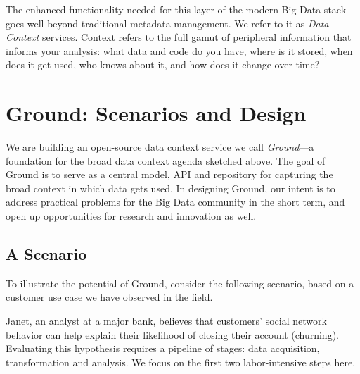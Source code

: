 \documentclass{sig-alternate}
\begin{document}
The enhanced functionality needed for this layer of the modern Big Data stack goes well beyond traditional metadata management. We refer to it as \emph{Data Context} services. Context refers to the full gamut of peripheral information that informs your analysis: what data and code do you have, where is it stored, when does it get used, who knows about it, and how does it change over time?  

\section{Ground: Scenarios and Design}
We are building an open-source data context service we call \emph{Ground}---a foundation for the broad data context agenda sketched above. 
The goal of Ground is to serve as a central model, API and repository for capturing the broad context in which data gets used. In designing Ground, our intent is to address practical problems for the Big Data community in the short term, and open up opportunities for research and innovation as well.

\subsection{A Scenario}
\label{sec:scenarios}
To illustrate the potential of Ground, consider the following scenario, based on a customer use case we have observed in the field.


Janet, an analyst at a major bank, believes that customers' social network behavior can help explain their likelihood of closing their account (churning). 
Evaluating this hypothesis requires a pipeline of stages: data acquisition, transformation and analysis.
We focus on the first two labor-intensive steps here.
\end{document}
